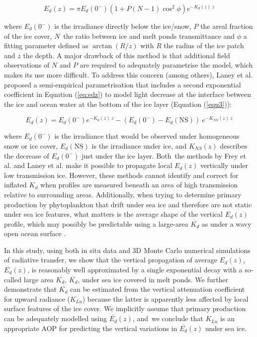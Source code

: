 \documentclass[applsci,article,accept,moreauthors,pdftex,10pt,a4paper]{Definitions/mdpi}
\newcommand{\ked}{\ensuremath{K_{d}}}
\newcommand{\klu}{\ensuremath{K_{Lu}}}
\newcommand{\edz}{\ensuremath{{E_d(z)}}}
\newcommand{\edzero}{\ensuremath{{E_d(0^-)}}}
\newcommand{\meanedz}{\ensuremath{{\overline{E_d}(z)}}}
\newcommand{\meanked}{\ensuremath{{\overline{K_{d}}}}}
\begin{document}
\begin{equation}
    \edz{} = \pi \edzero{} (1 + P(N-1)\cos^2\phi)e^{-\ked(z)~z}
    \label{eq:frey2011}
\end{equation}

\noindent where \edzero{} is the irradiance directly below the ice/snow, $P$ the areal fraction of the ice cover, $N$~the ratio between ice and melt ponds transmittance and $\phi$ a fitting parameter defined as $\arctan(R/z)$ with $R$ the radius of the ice patch and $z$ the depth. A major drawback of this method is that additional field observations of $N$ and $P$ are required to adequately parametrise the model, which makes its use more difficult. To address this concern (among others), Laney et al. \cite{Laney2017} proposed a semi-empirical parametrisation that includes a second exponential coefficient in Equation (\ref{eq:edz}) to model light decrease at the interface between the ice and ocean water at the bottom of the ice layer (Equation (\ref{equ3})):

\begin{equation}
    \edz{} = \edzero{}e^{-\ked(z)~z} - (\edzero{} - E_d(\text{NS}))~e^{-K_{NS}(z)~z}
    \label{equ3}
\end{equation}

\noindent where \edzero{} is the irradiance that would be observed under homogeneous snow or ice cover, $E_d(\text{NS})$ is the irradiance under ice, and $K_{NS}(z)$ describes the decrease of \edzero{} just under the ice layer. Both~the methods by Frey et al. \cite{Frey2011} and Laney et al. \cite{Laney2017} make it possible to propagate local \edz{} vertically under low transmission ice. However, these methods cannot identify and correct for inflated \ked{} when profiles are measured beneath an area of high transmission relative to surrounding areas. Additionally, when trying to determine primary production by phytoplankton that drift under sea ice and therefore are not static under sea ice features, what matters is the average shape of the vertical \edz{} profile, which may possibly be predictable using a large-area \meanked{} as under a wavy open ocean surface \citep{Zaneveld2001}. 

In this study, using both in situ data and 3D Monte Carlo numerical simulations of radiative transfer, we show that the vertical propagation of average \edz{}, \meanedz{}, is reasonably well approximated by a single exponential decay with a so-called large area \ked{}, \meanked{}, under sea ice covered in melt ponds. We further demonstrate that \meanked{} can be estimated from the vertical attenuation coefficient for upward radiance (\klu{}) because the latter is apparently less affected by local surface features of the ice cover. We implicitly assume that primary production can be adequately modelled using \meanedz{}, and~we conclude that \klu{} is an appropriate AOP for predicting the vertical variations in \meanedz{} under sea ice.
%
\end{document}
